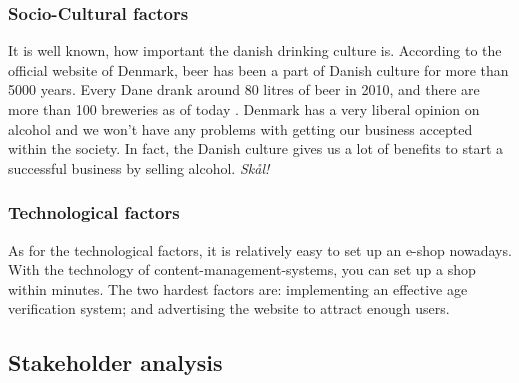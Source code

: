 \documentclass[12p]{article}
\begin{document}
\subsubsection{Socio-Cultural factors}

It is well known, how important the danish drinking culture is. According to the official website of Denmark, beer has been a part of Danish culture for more than 5000 years. Every Dane drank around 80 litres of beer in 2010, and there are more than 100 breweries as of today \cite{PEST_BeerInDenmark}. Denmark has a very liberal opinion on alcohol and we won't have any problems with getting our business accepted within the society. In fact, the Danish culture gives us a lot of benefits to start a successful business by selling alcohol. \emph{Skål!}

\subsubsection{Technological factors}

As for the technological factors, it is relatively easy to set up an e-shop nowadays. With the technology of content-management-systems, you can set up a shop within minutes. The two hardest factors are: implementing an effective age verification system; and advertising the website to attract enough users.

\newpage


\subsection{Stakeholder analysis} \label{StakeholderAnalysis}
\end{document}
